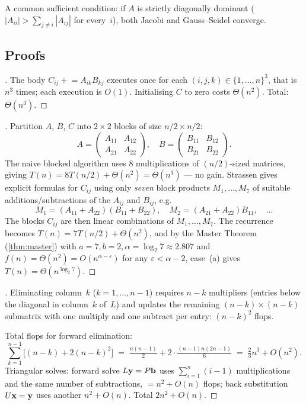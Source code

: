 A common sufficient condition: if $A$ is strictly diagonally dominant
($|A_{ii}| > \sum_{j \neq i} |A_{ij}|$ for every~$i$), both Jacobi and
Gauss--Seidel converge.

\subsection*{Proofs}

\begin{proof}[]
The body $C_{ij} \mathrel{+}= A_{ik} B_{kj}$ executes once for each
$(i, j, k) \in \{1, \dots, n\}^3$, that is $n^3$ times; each
execution is $O(1)$. Initialising $C$ to zero costs $\Theta(n^2)$.
Total: $\Theta(n^3)$.
\end{proof}

\begin{proof}[]
Partition $A$, $B$, $C$ into $2 \times 2$ blocks of size $n/2 \times n/2$:
\[
  A = \begin{pmatrix} A_{11} & A_{12} \\ A_{21} & A_{22} \end{pmatrix},\quad
  B = \begin{pmatrix} B_{11} & B_{12} \\ B_{21} & B_{22} \end{pmatrix}.
\]
The naive blocked algorithm uses $8$ multiplications of $(n/2)$-sized
matrices, giving $T(n) = 8 T(n/2) + \Theta(n^2) = \Theta(n^3)$ — no
gain. Strassen gives explicit formulas for $C_{ij}$ using only
\emph{seven} block products $M_1, \dots, M_7$ of suitable additions/subtractions
of the $A_{ij}$ and $B_{ij}$, e.g.
\[
  M_1 = (A_{11} + A_{22})(B_{11} + B_{22}),\quad
  M_2 = (A_{21} + A_{22}) B_{11},\quad \dots
\]
The blocks $C_{ij}$ are then linear combinations of $M_1, \dots, M_7$.
The recurrence becomes $T(n) = 7 T(n/2) + \Theta(n^2)$, and by the
Master Theorem (\cref{thm:master}) with $a = 7, b = 2, \alpha = \log_2 7 \approx 2.807$
and $f(n) = \Theta(n^2) = O(n^{\alpha - \varepsilon})$ for any
$\varepsilon < \alpha - 2$, case~(a) gives $T(n) = \Theta(n^{\log_2 7})$.
\end{proof}

\begin{proof}[]
Eliminating column~$k$ ($k = 1, \dots, n - 1$) requires $n - k$
multipliers (entries below the diagonal in column~$k$ of~$L$) and
updates the remaining $(n - k) \times (n - k)$ submatrix with one
multiply and one subtract per entry: $(n - k)^2$ flops.

Total flops for forward elimination:
\[
  \sum_{k=1}^{n-1} \bigl[(n - k) + 2 (n - k)^2\bigr]
  \;=\; \tfrac{n(n - 1)}{2} + 2 \cdot \tfrac{(n - 1) n (2n - 1)}{6}
  \;=\; \tfrac{2}{3} n^3 + O(n^2).
\]
Triangular solves: forward solve $L \mathbf{y} = P \mathbf{b}$ uses
$\sum_{i=1}^{n} (i - 1)$ multiplications and the same number of
subtractions, $= n^2 + O(n)$ flops; back substitution
$U \mathbf{x} = \mathbf{y}$ uses another $n^2 + O(n)$. Total $2 n^2 + O(n)$.
\end{proof}

